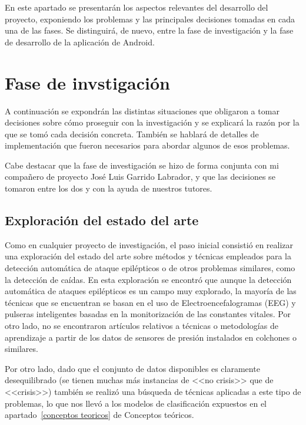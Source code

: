 \label{aspectos relevantes}

En este apartado se presentarán los aspectos relevantes del desarrollo del proyecto, exponiendo los problemas y las principales decisiones tomadas en cada una de las fases. Se distinguirá, de nuevo, entre la fase de investigación y la fase de desarrollo de la aplicación de Android. 

\section{Fase de invstigación}

A continuación se expondrán las distintas situaciones que obligaron a tomar decisiones sobre cómo proseguir con la investigación y se explicará la razón por la que se tomó cada decisión concreta. También se hablará de detalles de implementación que fueron necesarios para abordar algunos de esos problemas. 

Cabe destacar que la fase de investigación se hizo de forma conjunta con mi compañero de proyecto José Luis Garrido Labrador, y que las decisiones se tomaron entre los dos y con la ayuda de nuestros tutores. 

\subsection{Exploración del estado del arte}

Como en cualquier proyecto de investigación, el paso inicial consistió en realizar una exploración del estado del arte sobre métodos y técnicas empleados para la detección automática de ataque epilépticos o de otros problemas similares, como la detección de caídas. En esta exploración se encontró que aunque la detección automática de ataques epilépticos es un campo muy explorado, la mayoría de las técnicas que se encuentran se basan en el uso de Electroencefalogramas (EEG) y pulseras inteligentes basadas en la monitorización de las constantes vitales. Por otro lado, no se encontraron artículos relativos a técnicas o metodologías de aprendizaje a partir de los datos de sensores de presión instalados en colchones o similares.

Por otro lado, dado que el conjunto de datos disponibles es claramente desequilibrado (se tienen muchas más instancias de <<no crisis>> que de <<crisis>>) también se realizó una búsqueda de técnicas aplicadas a este tipo de problemas, lo que nos llevó a los modelos de clasificación expuestos en el apartado~\ref{conceptos teoricos} de Conceptos teóricos. 

